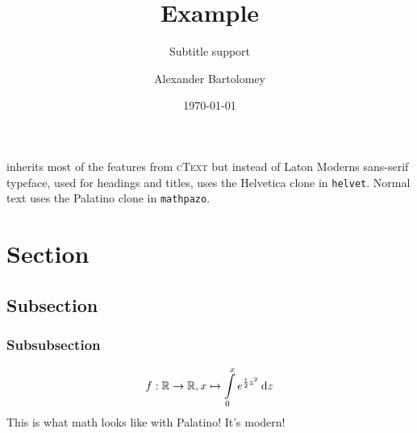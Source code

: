 \documentclass{etext}
\title{\etext Example}
\subtitle{Subtitle support}
\author{Alexander Bartolomey}
\date{\today}
\begin{document}
\maketitle
\etext inherits most of the features from \textsc{cText} but instead of Laton
Moderns sans-serif typeface, 
used for headings and titles, uses the Helvetica clone in \texttt{helvet}.
Normal text uses the Palatino clone in \texttt{mathpazo}.
\section{Section}
\lipsum[1]
\subsection{Subsection}
\lipsum[2]
\subsubsection{Subsubsection}
\[
  f: \mathbb{R} \rightarrow \mathbb{R}, x \mapsto \int\limits_{0}^{x} e^{\frac{1}{2}z^2}\:\text{d}z
\]
This is what math looks like with Palatino! It's modern!
\end{document}
